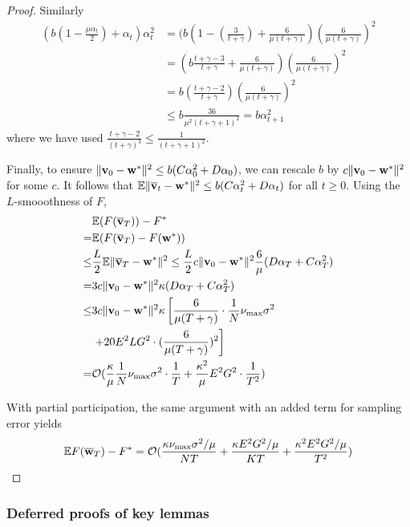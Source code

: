 \begin{proof}
Similarly 
\begin{align*}
(b(1-\frac{\mu\alpha_{t}}{2})+\alpha_{t})\alpha_{t}^{2} & =(b(1-(\frac{3}{t+\gamma})+\frac{6}{\mu(t+\gamma)})(\frac{6}{\mu(t+\gamma)})^{2}\\
& =(b\frac{t+\gamma-3}{t+\gamma}+\frac{6}{\mu(t+\gamma)})(\frac{6}{\mu(t+\gamma)})^{2}\\
& =b(\frac{t+\gamma-2}{t+\gamma})(\frac{6}{\mu(t+\gamma)})^{2}\\
& \leq b\frac{36}{\mu^{2}(t+\gamma+1)^{2}}=b\alpha_{t+1}^{2}
\end{align*}
where we have used $\frac{t+\gamma-2}{(t+\gamma)^{3}}\leq\frac{1}{(t+\gamma+1)^{2}}$.

Finally, to ensure $\|{\mathbf{v}}_{0}-{\mathbf{w}}^{\ast}\|^{2}\leq b(C\alpha_{0}^{2}+D\alpha_{0})$,
we can rescale $b$ by $c\|{\mathbf{v}}_{0}-{\mathbf{w}}^{\ast}\|^{2}$ for some $c.$ It
follows that $\mathbb{E}\|{\overline{\mathbf{v}}}_{t}-{\mathbf{w}}^{\ast}\|^{2}\leq b(C\alpha_{t}^{2}+D\alpha_{t})$
for all $t\geq0$. Using the $L$-smooothness of $F$,
\begin{align*}
&\mathbb{E}(F({\overline{\mathbf{v}}}_{T}))-F^{\ast} \\
=&\mathbb{E}(F({\overline{\mathbf{v}}}_{T})-F({\mathbf{w}}^{\ast}))\\
\leq & \frac{L}{2}\mathbb{E}\|{\overline{\mathbf{v}}}_{T}-{\mathbf{w}}^{\ast}\|^{2}\leq\frac{L}{2}c\|{\mathbf{v}}_{0}-{\mathbf{w}}^{\ast}\|^{2}\frac{6}{\mu}(D\alpha_{T}+C\alpha_{T}^{2})\\
= & 3c\|{\mathbf{v}}_{0}-{\mathbf{w}}^{\ast}\|^{2}\kappa(D\alpha_{T}+C\alpha_{T}^{2})\\
\leq &3c\|{\mathbf{v}}_{0}-{\mathbf{w}}^{\ast}\|^{2}\kappa\left[\frac{6}{\mu(T+\gamma)}\cdot\frac{1}{N}\nu_{\max}\sigma^{2}\right. \\ 
& \left.+20E^{2}LG^{2}\cdot(\frac{6}{\mu(T+\gamma)})^{2}\right]\\
 =&\mathcal{O}(\frac{\kappa}{\mu}\frac{1}{N}\nu_{\max}\sigma^{2}\cdot\frac{1}{T}+\frac{\kappa^{2}}{\mu}E^{2}G^{2}\cdot\frac{1}{T^{2}})
\end{align*}

With partial participation, the same argument with an added term for sampling error yields
\begin{align*}
\mathbb{E}F({\overline{\mathbf{w}}}_{T})-F^{\ast}=\mathcal{O}(\frac{\kappa\nu_{\max}\sigma^{2}/\mu}{NT}+\frac{\kappa E^{2}G^{2}/\mu}{KT}+\frac{\kappa^{2}E^{2}G^{2}/\mu}{T^{2}})
\end{align*}
\end{proof}

\subsubsection{Deferred proofs of key lemmas}

